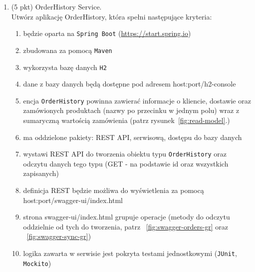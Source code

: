 \documentclass[12pt]{article}
\begin{document}
\begin{enumerate}
        \item\label{exc:order_history_service}
            (5 pkt) OrderHistory Service.\\
            Utwórz aplikację OrderHistory, która spełni następujące kryteria:
            \begin{enumerate}
                \item będzie oparta na \texttt{Spring Boot} (\url{https://start.spring.io})
                \item zbudowana za pomocą \texttt{Maven}
                \item wykorzysta bazę danych \texttt{H2} 
                \item dane z bazy danych będą dostępne pod adresem host:port/h2-console 
                \item encja \texttt{OrderHistory} powinna zawierać informacje o kliencie, dostawie oraz zamówionych produktach (nazwy po przecinku w jednym polu) wraz z sumaryczną wartością zamówienia (patrz rysunek~\ref{fig:read-model}.)
                \item ma oddzielone pakiety: REST API, serwisową, dostępu do bazy danych
                \item wystawi REST API do tworzenia obiektu typu \texttt{OrderHistory} oraz odczytu danych tego typu (GET - na podstawie id oraz wszystkich zapisanych)
                \item definicja REST będzie możliwa do wyświetlenia za pomocą host:port/swagger-ui/index.html
                \item strona swagger-ui/index.html grupuje operacje (metody do odczytu oddzielnie od tych do tworzenia, patrz ~\ref{fig:swagger-orders-gr} oraz ~\ref{fig:swagger-sync-gr})
                \item logika zawarta w serwisie jest pokryta testami jednostkowymi (\texttt{JUnit}, \texttt{Mockito})
            \end{enumerate}  


\end{enumerate}
\end{document}
